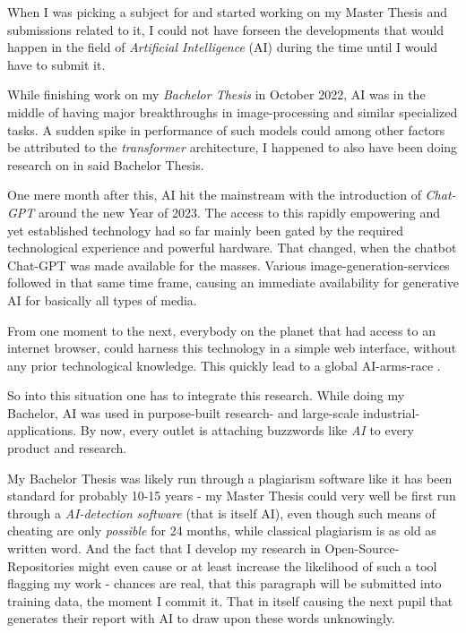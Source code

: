 When I was picking a subject for and started working on my Master Thesis and submissions related to it, I could not have forseen the developments that would happen in the field of \emph{Artificial Intelligence} (AI) during the time until I would have to submit it.

While finishing work on my \emph{Bachelor Thesis} \cite{bachelorThesis} in October 2022, AI was in the middle of having major breakthroughs in image-processing and similar specialized tasks. 
A sudden spike in performance of such models could among other factors be attributed to the \emph{transformer} architecture, I happened to also have been doing research on in said Bachelor Thesis.

One mere month after this, AI hit the mainstream with the introduction of \emph{Chat-GPT} \cite{chatGPT} around the new Year of 2023.
The access to this rapidly empowering and yet established technology had so far mainly been gated by the required technological experience and powerful hardware. 
That changed, when the chatbot Chat-GPT was made available for the masses. 
Various image-generation-services followed in that same time frame, causing an immediate availability for generative AI for basically all types of media.

From one moment to the next, everybody on the planet that had access to an internet browser, could harness this technology in a simple web interface, without any prior technological knowledge. 
This quickly lead to a global AI-arms-race \cite{aiBoom}.


So into this situation one has to integrate this research. 
While doing my Bachelor, AI was used in purpose-built research- and large-scale industrial-applications.
By now, every outlet is attaching buzzwords like \emph{AI} to every product and research.

My Bachelor Thesis was likely run through a plagiarism software like it has been standard for probably 10-15 years - my Master Thesis could very well be first run through a \emph{AI-detection software} (that is itself \glqq AI\grqq), even though such means of cheating are only \emph{possible} for 24 months, while classical plagiarism is as old as written word.
And the fact that I develop my research in Open-Source-Repositories might even cause or at least increase the likelihood of such a tool flagging my work - chances are real, that this paragraph will be submitted into training data, the moment I commit it.
That in itself causing the next pupil that generates their report with AI to draw upon these words unknowingly.\\

